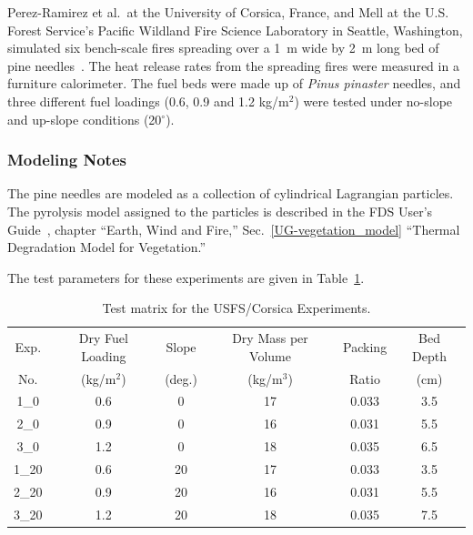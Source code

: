 Perez-Ramirez et al.~at the University of Corsica, France, and Mell at the U.S. Forest Service's Pacific Wildland Fire Science Laboratory in Seattle, Washington, simulated six bench-scale fires spreading over a 1~m wide by 2~m long bed of pine needles~\cite{Perez-Ramirez:FT2017}. The heat release rates from the spreading fires were measured in a furniture calorimeter. The fuel beds were made up of {\em Pinus pinaster} needles, and three different fuel loadings (0.6, 0.9 and 1.2 kg/m$^2$) were tested under no-slope and up-slope conditions (20$^\circ$).

\subsubsection{Modeling Notes}

The pine needles are modeled as a collection of cylindrical Lagrangian particles. The pyrolysis model assigned to the particles is described in the FDS User's Guide~\cite{FDS_Users_Guide}, chapter ``Earth, Wind and Fire,'' Sec.~\ref{UG-vegetation_model} ``Thermal Degradation Model for Vegetation.''

The test parameters for these experiments are given in Table~\ref{Corsica_Parameters}.

\begin{table}[ht!]
\begin{center}
\begin{tabular}{|c|c|c|c|c|c|}
\hline
Exp.         & Dry Fuel Loading    & Slope 	   & Dry Mass per Volume  & Packing & Bed Depth	    \\
No.          & (kg/m$^2$)          & (deg.)    & (kg/m$^3$)           & Ratio   & (cm)          \\ \hline \hline
1\_0         & 0.6                 & 0         & 17                   & 0.033   & 3.5          	\\ \hline
2\_0         & 0.9                 & 0         & 16                   & 0.031   & 5.5          	\\ \hline
3\_0         & 1.2                 & 0         & 18                   & 0.035   & 6.5          	\\ \hline
1\_20        & 0.6                 & 20        & 17                   & 0.033   & 3.5          	\\ \hline
2\_20        & 0.9                 & 20        & 16                   & 0.031   & 5.5          	\\ \hline
3\_20        & 1.2                 & 20        & 18                   & 0.035   & 7.5          	\\ \hline
\end{tabular}
\end{center}
\caption[Test matrix for the USFS/Corsica Experiments]
{Test matrix for the USFS/Corsica Experiments.}
\label{Corsica_Parameters}
\end{table}



